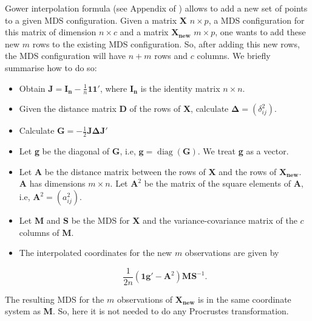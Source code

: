 \documentclass[11pt]{report}
\DeclareMathOperator{\diag}{diag}
\begin{document}
Gower interpolation formula (see Appendix of \cite{gowerformula}) allows to add 
a new set of points to a given MDS configuration. Given a matrix 
\textbf{X} $n \times p$, a MDS configuration for this matrix of dimension 
$n \times c$ and a matrix $\mathbf{X_{new}}$ $m \times p$, one wants to 
add these new $m$ rows to the existing MDS configuration. So, 
after adding this new rows, the MDS configuration will have $n+m$ rows and 
$c$ columns. We briefly summarise how to do so:

\begin{itemize}

\item Obtain $\mathbf{J} = \mathbf{I_n} - \frac{1}{n}\mathbf{1}\mathbf{1}'$,
where $\mathbf{I_n}$ is the identity matrix $n \times n$.

\item Given the distance matrix \textbf{D} of the rows of \textbf{X},
calculate $\mathbf{\Delta} = (\delta_{ij}^2)$.

\item Calculate $\mathbf{G} = - \frac{1}{2} \mathbf{J} \mathbf{\Delta} \mathbf{J}'$

\item Let \textbf{g} be the diagonal of \textbf{G}, i.e, 
$\mathbf{g} = \diag({\mathbf{G}})$. We treat \textbf{g} as a vector. 

\item Let \textbf{A} be the distance matrix between the rows of 
\textbf{X} and the rows of $\mathbf{X_{new}}$. \textbf{A} has dimensions 
$m \times n$. Let $\mathbf{A}^2$ be the matrix of the square elements 
of \textbf{A}, i.e, $\mathbf{A}^2 = (a_{ij}^2)$.

\item Let \textbf{M} and \textbf{S} be the MDS for \textbf{X} and the 
variance-covariance matrix of the $c$ columns of \textbf{M}.

\item The interpolated coordinates for the new $m$ observations are given by

\begin{equation} \label{gower_f}
\frac{1}{2n} (\mathbf{1}\mathbf{g}' - \mathbf{A}^2) \mathbf{M}\mathbf{S}^{-1}.
\end{equation}

\end{itemize}

The resulting MDS for the $m$ observations of $\mathbf{X_{new}}$ is in the same
coordinate system as \textbf{M}. So, here it is not needed to do any 
Procrustes transformation.
\end{document}
